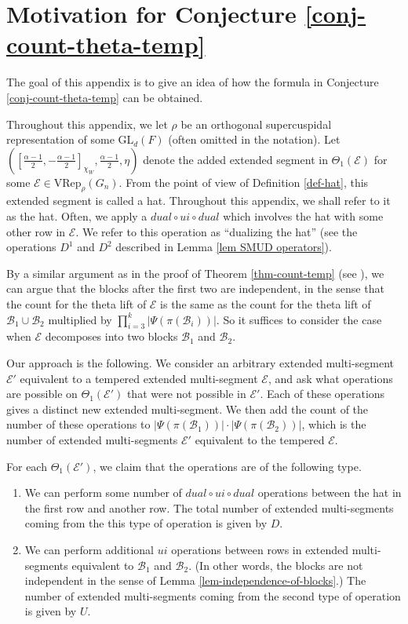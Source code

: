 \documentclass[11pt,letterpaper]{amsart}
\newcommand{\VRep}{{\mathrm{VRep}}}
\newcommand{\GL}{\mathrm{GL}}
\newcommand{\BB}{\mathcal{B}}
\newcommand{\EE}{\mathcal{E}}
\numberwithin{equation}{section}
\begin{document}
\section{Motivation for Conjecture \ref{conj-count-theta-temp}}\label{sec motivation}

The goal of this appendix is to give an idea of how the formula in Conjecture \ref{conj-count-theta-temp} can be obtained. 

Throughout this appendix, we let $\rho$ be an orthogonal supercuspidal representation of some $\GL_d(F)$ (often omitted in the notation). Let $([\frac{\alpha-1}{2},-\frac{\alpha-1}{2}]_{\chi_W}, \frac{\alpha-1}{2}, \eta)$ denote the added extended segment in $\Theta_1(\EE)$ for some $\EE\in\VRep_\rho(G_n).$ From the point of view of Definition \ref{def-hat}, this extended segment is called a hat. Throughout this appendix, we shall refer to it as the hat. Often, we apply a $dual\circ ui \circ dual$ which involves the hat with some other row in $\EE.$ We refer to this operation as ``dualizing the hat'' (see the operations $D^1$ and $D^2$ described in Lemma \ref{lem SMUD operators}).


By a similar argument as in the proof of Theorem \ref{thm-count-temp} (see \cite[\S 7]{HKT26}), we can argue that the blocks after the first two are independent, in the sense that the count for the theta lift of $\EE$ is the same as the count for the theta lift of $\BB_1 \cup \BB_2$ multiplied by $\prod_{i=3}^k |\Psi(\pi(\BB_i))|$. So it suffices to consider the case when $\EE$ decomposes into two blocks $\BB_1$ and $\BB_2$.

Our approach is the following. We consider an arbitrary extended multi-segment $\EE'$ equivalent to a tempered extended multi-segment $\EE$, and ask what operations are possible on $\Theta_1(\EE')$ that were not possible in $\EE'$. Each of these operations gives a distinct new extended multi-segment. We then add the count of the number of these operations to $|\Psi(\pi(\BB_1))| \cdot |\Psi(\pi(\BB_2))|$, which is the number of extended multi-segments $\EE'$ equivalent to the tempered $\EE$.

For each $\Theta_1(\EE')$, we claim that the operations are of the following type.
\begin{enumerate}
    \item We can perform some number of $dual \circ ui \circ dual$ operations between the hat in the first row and another row. The total number of extended multi-segments coming from the this type of operation is given by $D$.
    \item We can perform additional $ui$ operations between rows in extended multi-segments equivalent to $\BB_1$ and $\BB_2$. (In other words, the blocks are not independent in the sense of Lemma \ref{lem-independence-of-blocks}.) The number of extended multi-segments coming from the second type of operation is given by $U$.
\end{enumerate}
\end{document}
